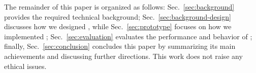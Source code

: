 The remainder of this paper is organized as follows: Sec.~\ref{sec:background} provides the required technical background; Sec.~\ref{sec:background-design} discusses how we designed \tcpls, while Sec.~\ref{sec:prototype} focuses on how we implemented \tcpls; Sec.~\ref{sec:evaluation} evaluates the performance and behavior of \tcpls;  finally, Sec.~\ref{sec:conclusion} concludes this paper by summarizing its main achievements and discussing further directions.
This work does not raise any ethical issues.





